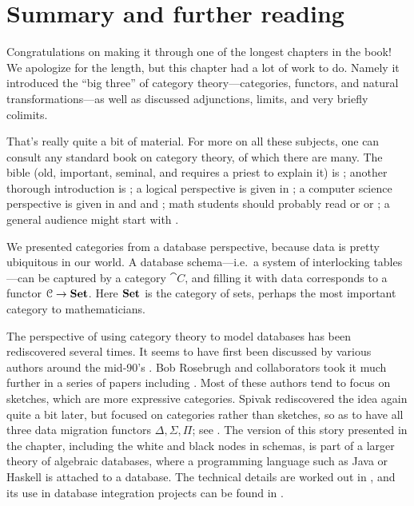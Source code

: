 \documentclass[7Sketches]{subfiles}
\begin{document}
\section{Summary and further reading}%
\label{sec.ch2_further_reading}

Congratulations on making it through one of the longest chapters in the book! We
apologize for the length, but this chapter had a lot of work to do. Namely it
introduced the ``big three'' of category theory---categories, functors, and
natural transformations---as well as discussed adjunctions, limits, and very briefly colimits.

That's really quite a bit of material. For more on all these subjects, one can
consult any standard book on category theory, of which there are many. The bible
(old, important, seminal, and requires a priest to explain it) is
\cite{MacLane:1998a}; another thorough introduction is \cite{Borceux:1994a}; a
logical perspective is given in \cite{Awodey:2010a}; a computer science
perspective is given in \cite{Barr.Wells:1990a} and \cite{Pierce:1991} and
\cite{Walters:1992}; math students should probably read \cite{Leinster:2014a} or
\cite{Riehl:2017a} or \cite{Grandis:2018}; a general audience might start with \cite{Spivak:2014a}.

We presented categories from a database perspective, because data is pretty ubiquitous in our world. A database schema---i.e.\ a system of interlocking tables---can be captured by a category $\cat{C}$, and filling it with data corresponds to a functor $\mathcal{C}\to\mathbf{Set}$. Here $\mathbf{Set}$ is the category of sets, perhaps the most important category to mathematicians.

The perspective of using category theory to model databases has been rediscovered several times. It seems to have first been discussed by various authors around the mid-90's \cite{Islam.Phoa:1994a,Cadish.Diskin:1995a,Piessens.Steegmans:1995a,Tuijn.Gyssens:1996a}. Bob Rosebrugh and collaborators took it much further in a series of papers including \cite{Fleming.Gunther.Rosebrugh:2003a,Johnson.Rosebrugh:2002a,Rosebrugh.Wood:1992a}. Most of these authors tend to focus on sketches, which are more expressive categories. Spivak rediscovered the idea again quite a bit later, but focused on categories rather than sketches, so as to have all three data migration functors $\Delta,\Sigma,\Pi$; see \cite{spivakfunctorial2012,Spivak.Wisnesky:2015a}. The version of this story presented in the chapter, including the white and black nodes in schemas, is part of a larger theory of algebraic databases, where a programming language such as Java or Haskell is attached to a database. The technical details are worked out in \cite{Schultz.Spivak.Vasilakopoulou.Wisnesky:2017a}, and its use in database integration projects can be found in \cite{Schultz.Wisnesky:2015a,Wisnesky.Spivak.Schultz.Subrahmanian:2015a,}.
\end{document}
